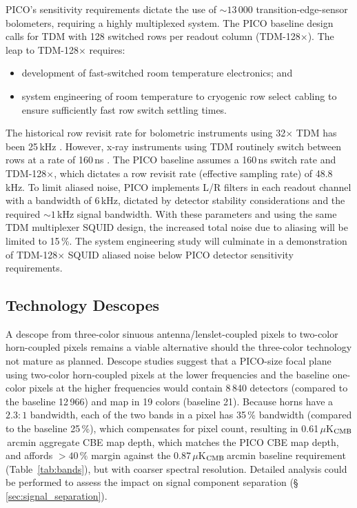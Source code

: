 PICO's sensitivity requirements dictate the use of $\sim 13\,000$
transition-edge-sensor bolometers, requiring a highly multiplexed
system.  The PICO baseline design calls for TDM
with 128 switched rows per readout column (TDM-128$\times$). The leap
to TDM-128$\times$ requires:
\begin{itemize}
\item development of fast-switched room temperature electronics; and
\item system engineering of room temperature to cryogenic row select cabling to ensure sufficiently fast row switch settling times.
\end{itemize}

The historical row revisit rate for bolometric instruments using
32$\times$ TDM has been 25\,kHz \cite[e.g.,][]{BICEP2015}. However,
x-ray instruments using TDM routinely switch between rows at a rate of
160\,ns \citep{Doriese2016}. The PICO baseline assumes a 160\,ns
switch rate and TDM-128$\times$, which dictates a row revisit rate
(effective sampling rate) of 48.8\,kHz. To limit aliased noise, PICO
implements L/R filters in each readout channel with a bandwidth of
6\,kHz, dictated by detector stability considerations and the required
$\sim1$\,kHz signal bandwidth.  With these parameters and using the
same TDM multiplexer SQUID design, the increased total noise due to
aliasing will be limited to 15\,\%.  The system engineering study will
culminate in a demonstration of TDM-128$\times$ SQUID aliased noise
below PICO detector sensitivity requirements.







\subsection{Technology Descopes}
\label{sec:technology_descopes} %

A descope from three-color sinuous antenna/lenslet-coupled pixels to two-color horn-coupled pixels remains a viable
alternative should the three-color technology not mature as
planned. Descope studies suggest that a PICO-size focal plane using
two-color horn-coupled pixels at the lower frequencies and the baseline one-color
pixels at the higher frequencies would contain 8\,840 detectors
(compared to the baseline 12\,966) and map in 19 colors (baseline
21). Because horns have a $2.3:1$ bandwidth, each of the two bands in
a pixel has 35\,\% bandwidth (compared to the baseline 25\,\%), which
compensates for pixel count, resulting in
0.61\,$\mu$K$_{\rm CMB}$\,arcmin aggregate CBE map depth, which
matches the PICO CBE map depth, and affords $>40\,\%$ margin against
the 0.87\,$\mu$K$_{\rm CMB}$\,arcmin baseline requirement
(Table~\ref{tab:bands}), but with coarser spectral resolution.
Detailed analysis could be performed to assess the impact on signal component separation (\S\,\ref{sec:signal_separation}).

